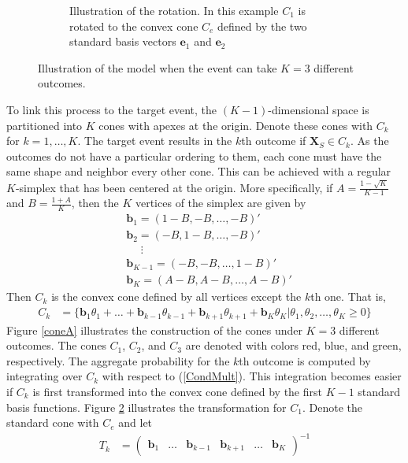 \documentclass[11pt,twoside]{article}
\theoremstyle{definition}
\theoremstyle{definition}
\begin{document}
\begin{figure}
\begin{subfigure}[b]{0.45\textwidth}
\caption{Illustration of the rotation. In this example $C_1$ is rotated to the convex cone $C_e$ defined by the two standard basis vectors $\boldsymbol{e}_1$ and $\boldsymbol{e}_2$}
\label{coneB}
        \end{subfigure}
        \caption{Illustration of the model when the event can take $K = 3$ different outcomes.}
\end{figure}



To link this process to the target event, the $(K-1)$-dimensional space is partitioned into $K$ cones with apexes at the origin. Denote these cones with $C_k$ for $k = 1, \dots, K$. The target event results in the $k$th outcome if $\boldsymbol{X}_S \in C_k$. As the outcomes do not have a particular ordering to them, each cone must have the same shape and neighbor every other cone. This can be achieved with a regular $K$-simplex that has been centered at the origin. More specifically, if $A = \frac{1- \sqrt{K}}{K-1}$ and $B = \frac{1+A}{K}$, then the $K$ vertices of the simplex are given by 
\begin{align*}
&\boldsymbol{b}_1 = (1-B, -B, \dots, -B)'\\
&\boldsymbol{b}_2 = (-B, 1-B, \dots, -B)'\\
& \phantom{=}\vdots\\
&\boldsymbol{b}_{K-1} = (-B, -B, \dots, 1-B)'\\
&\boldsymbol{b}_{K} = \left(A-B, A-B, \dots, A-B \right)'
\end{align*}
Then $C_k$ is the convex cone defined by all vertices except the $k$th one. That is, 
\begin{align*}
C_k &= \{\boldsymbol{b}_1\theta_1 + \dots + \boldsymbol{b}_{k-1}\theta_{k-1} + \boldsymbol{b}_{k+1}\theta_{k+1} + \boldsymbol{b}_{K}\theta_{K} | \theta_1, \theta_2, \dots, \theta_K \geq 0\} 
\end{align*}
Figure \ref{coneA} illustrates the construction of the cones under $K = 3$ different outcomes. The cones $C_1$, $C_2$, and $C_3$ are denoted with colors red, blue, and green, respectively. The aggregate probability for the $k$th outcome is computed by integrating over $C_k$ with respect to (\ref{CondMult}). This integration becomes easier if $C_k$ is first transformed into the convex cone defined by the first $K-1$ standard basis functions. Figure \ref{coneB} illustrates the transformation for $C_1$.  Denote the standard cone with $C_e$ and let 
\begin{align*}
T_k &= \left(\begin{matrix} 
\boldsymbol{b}_1& \dots & \boldsymbol{b}_{k-1} & \boldsymbol{b}_{k+1} & \dots & \boldsymbol{b}_K
 \end{matrix}\right) ^{-1}
\end{align*}
\end{document}
